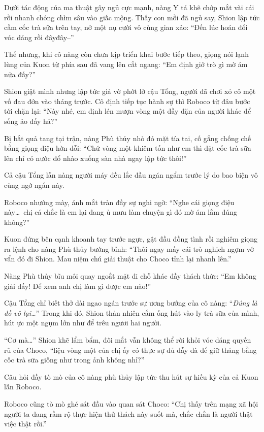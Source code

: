 \documentclass[../main.tex]{subfiles}
\begin{document}
Dưới tác động của ma thuật gây ngủ cực mạnh, nàng Y tá khẽ chớp mắt vài cái rồi nhanh chóng chìm sâu vào giấc mộng. Thấy con mồi đã ngủ say, Shion lập tức cầm cốc trà sữa trên tay, nở một nụ cười vô cùng gian xảo:
``Đến lúc hoán đổi vóc dáng rồi đâyđây--''

Thế nhưng, khi cô nàng còn chưa kịp triển khai bước tiếp theo, giọng nói lạnh lùng của Kuon từ phía sau đã vang lên cắt ngang:
``Em định giở trò gì mờ ám nữa đấy?''

Shion giật mình nhưng lập tức giả vờ phớt lờ cậu Tổng, người đã chơi xỏ cô một vố đau đớn vào tháng trước. Cô định tiếp tục hành sự thì Roboco từ đâu bước tới chặn lại:
``Này nhé, em định lén mượn vòng một đầy đặn của người khác để sống ảo đấy hả?''

Bị bắt quả tang tại trận, nàng Phù thủy nhỏ đỏ mặt tía tai, cố gắng chống chế bằng giọng điệu hờn dỗi:
``Chứ vòng một khiêm tốn như em thì đặt cốc trà sữa lên chỉ có nước đổ nhào xuống sàn nhà ngay lập tức thôi!''

Cả cậu Tổng lẫn nàng người máy đều lắc đầu ngán ngẩm trước lý do bao biện vô cùng ngớ ngẩn này.

Roboco nhướng mày, ánh mắt tràn đầy sự nghi ngờ:
``Nghe cái giọng điệu này\dots\ chị cá chắc là em lại đang ủ mưu làm chuyện gì đó mờ ám lắm đúng không?''

Kuon đứng bên cạnh khoanh tay trước ngực, gật đầu đồng tình rồi nghiêm giọng ra lệnh cho nàng Phù thủy bướng bỉnh:
``Thôi ngay mấy cái trò nghịch ngợm vớ vẩn đó đi Shion. Mau niệm chú giải thuật cho Choco tỉnh lại nhanh lên.''

Nàng Phù thủy bĩu môi quay ngoắt mặt đi chỗ khác đầy thách thức:
``Em không giải đấy! Để xem anh chị làm gì được em nào!''

Cậu Tổng chỉ biết thở dài ngao ngán trước sự ương bướng của cô nàng: ``\textit{Đúng là đồ vô lại\dots}'' Trong khi đó, Shion thản nhiên cắm ống hút vào ly trà sữa của mình, hút ực một ngụm lớn như để trêu ngươi hai người.

\ct

``Cơ mà\dots'' Shion khẽ lẩm bẩm, đôi mắt vẫn không thể rời khỏi vóc dáng quyến rũ của Choco, ``liệu vòng một của chị ấy có thực sự đủ đẫy đà để giữ thăng bằng cốc trà sữa giống như trong ảnh không nhỉ?''

Câu hỏi đầy tò mò của cô nàng phù thủy lập tức thu hút sự hiếu kỳ của cả Kuon lẫn Roboco.


Roboco cũng tò mò ghé sát đầu vào quan sát Choco:
``Chị thấy trên mạng xã hội người ta đang rầm rộ thực hiện thử thách này suốt mà, chắc chắn là người thật việc thật rồi.''
\end{document}
